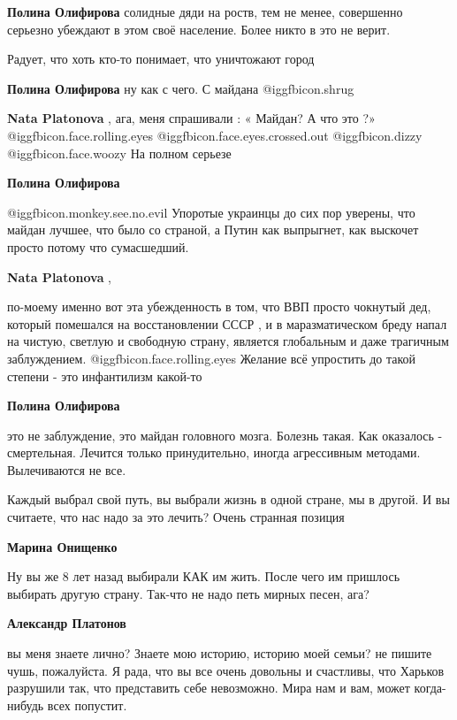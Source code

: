 \begin{itemize}
\begin{itemize}
\textbf{Полина Олифирова} солидные дяди на роств, тем не менее, совершенно серьезно убеждают в этом своё население. Более никто в это не верит.

Радует, что хоть кто-то понимает, что уничтожают город

\textbf{Полина Олифирова} ну как с чего. С майдана  @igg{fbicon.shrug} 

\textbf{Nata Platonova} , ага, меня спрашивали : « Майдан? А что это ?»  @igg{fbicon.face.rolling.eyes}  @igg{fbicon.face.eyes.crossed.out}  @igg{fbicon.dizzy}  @igg{fbicon.face.woozy}  На полном серьезе

\textbf{Полина Олифирова} 

 @igg{fbicon.monkey.see.no.evil}  Упоротые украинцы до сих пор уверены, что майдан лучшее, что было со
страной, а Путин как выпрыгнет, как выскочет просто потому что сумасшедший.

\textbf{Nata Platonova} , 

по-моему именно вот эта убежденность в том, что ВВП просто чокнутый дед,
который помешался на восстановлении СССР , и в маразматическом бреду напал на
чистую, светлую и свободную страну, является глобальным и даже трагичным
заблуждением.  @igg{fbicon.face.rolling.eyes}  Желание всё упростить до такой степени - это инфантилизм
какой-то

\textbf{Полина Олифирова} 

это не заблуждение, это майдан головного мозга. Болезнь такая. Как оказалось -
смертельная. Лечится только принудительно, иногда агрессивным методами.
Вылечиваются не все.


Каждый выбрал свой путь, вы выбрали жизнь в одной стране, мы в другой. И вы
считаете, что нас надо за это лечить? Очень странная позиция

\textbf{Марина Онищенко} 

Ну вы же 8 лет назад выбирали КАК им жить. После чего им пришлось выбирать
другую страну. Так-что не надо петь мирных песен, ага?


\textbf{Александр Платонов} 

вы меня знаете лично? Знаете мою историю, историю моей семьи? не пишите чушь,
пожалуйста. Я рада, что вы все очень довольны и счастливы, что Харьков
разрушили так, что представить себе невозможно. Мира нам и вам, может
когда-нибудь всех попустит.


\end{itemize}
\end{itemize}
